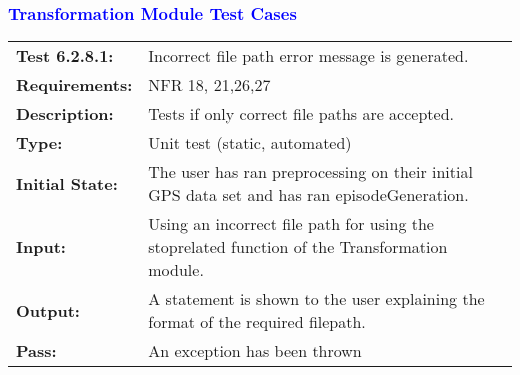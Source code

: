 \documentclass[12pt, titlepage]{article}
\begin{document}
\textcolor{blue}{
\subsubsection{Transformation Module Test Cases}
\begin{tabular}{|l|p{10cm}|}
    \hline
    \bf{Test} 6.2.8.1: & Incorrect file path error message is generated.\\
    \bf{Requirements}: & NFR 18, 21,26,27 \\
    \bf{Description}: & Tests if only correct file paths are accepted. \\
    \bf{Type}: & Unit test (static, automated) \\
    \bf{Initial State}: & The user has ran preprocessing on their initial GPS data set and has ran episodeGeneration. \\
    \bf{Input}: & Using an incorrect file path for using the stoprelated function of the Transformation module.\\
    \bf{Output}: & A statement is shown to the user explaining the format of the required filepath. \\
    \bf{Pass}: & An exception has been thrown \\
    \hline 
\end{tabular}
}
\end{document}
